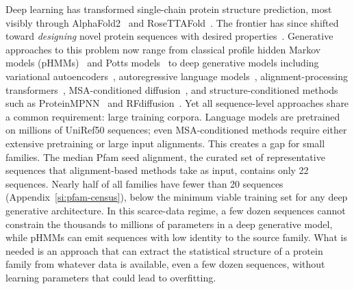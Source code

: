 
Deep learning has transformed single-chain protein structure prediction, most visibly through AlphaFold2~\cite{jumperHighlyAccurateProtein2021} and RoseTTAFold~\cite{baekRoseTTAFold2021}. The frontier has since shifted toward \emph{designing} novel protein sequences with desired properties~\cite{kuhlmanBradleyAdvances2019,huangComingAgeDeNovo2016}. Generative approaches to this problem now range from classical profile hidden Markov models (pHMMs)~\cite{hmmer3,kroghHiddenMarkovModels1994} and Potts models~\cite{morcosDirectCouplingAnalysis2011,ekeberg2013improved,trinquierEfficientGenerativeModeling2021} to deep generative models including variational autoencoders~\cite{kingmaWellingAutoEncoding2014,riesselman2018deep}, autoregressive language models~\cite{ferruzProtGPT2DeepUnsupervised2022,madaniProGenLanguageModeling2023}, alignment-processing transformers~\cite{raoMSATransformer2021}, MSA-conditioned diffusion~\cite{alamdariProteinGeneration2023}, and structure-conditioned methods such as ProteinMPNN~\cite{dauparasProteinMPNN2022} and RFdiffusion~\cite{watsonRFdiffusion2023}. Yet all sequence-level approaches share a common requirement: large training corpora. Language models are pretrained on millions of UniRef50 sequences; even MSA-conditioned methods require either extensive pretraining or large input alignments. This creates a gap for small families. The median Pfam seed alignment, the curated set of representative sequences that alignment-based methods take as input, contains only 22 sequences. Nearly half of all families have fewer than 20 sequences (Appendix~\ref{si:pfam-census}), below the minimum viable training set for any deep generative architecture. In this scarce-data regime, a few dozen sequences cannot constrain the thousands to millions of parameters in a deep generative model, while pHMMs can emit sequences with low identity to the source family. What is needed is an approach that can extract the statistical structure of a protein family from whatever data is available, even a few dozen sequences, without learning parameters that could lead to overfitting.

